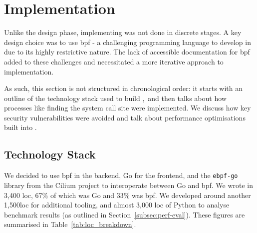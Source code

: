\section{Implementation}\label{sec:implementation}

Unlike the design phase, implementing \af was not done in discrete
stages. A key design choice was to use \ac{bpf} - a challenging programming language
to develop in due to its highly restrictive nature. The lack of accessible
documentation for \ac{bpf} added to these challenges and necessitated a more
iterative approach to implementation.

As such, this section is not structured in chronological order: it starts with
an outline of the technology stack used to build \afss,~and then talks about how
processes like finding the system call site were implemented. We discuss 
how key security vulnerabilities were avoided and talk about performance 
optimisations built into \af.

\subsection{Technology Stack}\label{subsection:tech-stack}

We decided to use \ac{bpf} in the backend, Go for the frontend, and the
\texttt{ebpf-go} library from the Cilium project to interoperate between Go and
\ac{bpf}. We wrote \af in 3,400 \ac{loc}, 67\% of which was Go and 33\% was 
\ac{bpf}. We developed around another 1,500\ac{loc} for additional tooling, and
almost 3,000 \ac{loc} of Python to analyse benchmark results (as outlined in
Section~\ref{subsec:perf-eval}). These figures are summarised in
Table~\ref{tab:loc_breakdown}.

